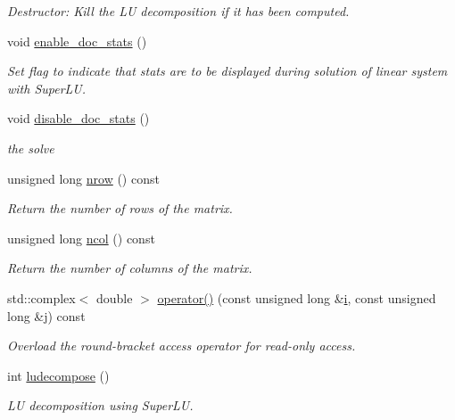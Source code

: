 \begin{DoxyCompactItemize}
\begin{DoxyCompactList}\small\item\em Destructor\+: Kill the LU decomposition if it has been computed. \end{DoxyCompactList}\item 
void \hyperlink{classoomph_1_1CRComplexMatrix_a2a36aa0cbdba895ffd0b83f1d9575325}{enable\+\_\+doc\+\_\+stats} ()
\begin{DoxyCompactList}\small\item\em Set flag to indicate that stats are to be displayed during solution of linear system with Super\+LU. \end{DoxyCompactList}\item 
void \hyperlink{classoomph_1_1CRComplexMatrix_aacd1c3945b8a266141fbc7c32d7eb4c7}{disable\+\_\+doc\+\_\+stats} ()
\begin{DoxyCompactList}\small\item\em the solve \end{DoxyCompactList}\item 
unsigned long \hyperlink{classoomph_1_1CRComplexMatrix_a08280a10665278ab233777ca7f510345}{nrow} () const
\begin{DoxyCompactList}\small\item\em Return the number of rows of the matrix. \end{DoxyCompactList}\item 
unsigned long \hyperlink{classoomph_1_1CRComplexMatrix_a4151bc429f2da548cee234e147003bfa}{ncol} () const
\begin{DoxyCompactList}\small\item\em Return the number of columns of the matrix. \end{DoxyCompactList}\item 
std\+::complex$<$ double $>$ \hyperlink{classoomph_1_1CRComplexMatrix_a1a800a78ffb803e931d6884c66e9220d}{operator()} (const unsigned long \&\hyperlink{cfortran_8h_adb50e893b86b3e55e751a42eab3cba82}{i}, const unsigned long \&j) const
\begin{DoxyCompactList}\small\item\em Overload the round-\/bracket access operator for read-\/only access. \end{DoxyCompactList}\item 
int \hyperlink{classoomph_1_1CRComplexMatrix_a8f2e601ccd4bb7c74af3c55cf6c3290b}{ludecompose} ()
\begin{DoxyCompactList}\small\item\em LU decomposition using Super\+LU. \end{DoxyCompactList}\item 

\end{DoxyCompactItemize}
